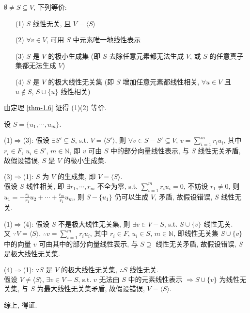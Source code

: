 \documentclass{note}
\begin{document}
\begin{thm}[(课本定理 1.7)]
    $\emptyset\neq S\subseteq V$, 下列等价:
    \begin{itemize}
        \item[(1)] $S$ 线性无关, 且 $V=\langle S\rangle$
        \item[(2)] $\forall v\in V$, 可用 $S$ 中元素唯一地线性表示
        \item[(3)] $S$ 是 $V$ 的极小生成集 (即 $S$ 去除任意元素都无法生成 $V$, 或 $S$ 的任意真子集都无法生成 $V$)
        \item[(4)] $S$ 是 $V$ 的极大线性无关集 (即 $S$ 增加任意元素都线性相关, $\forall u\in V$ 且 $u\notin S$, $S\cup\{u\}$ 线性相关)
    \end{itemize}
\end{thm}
\begin{pf}
    由定理 \ref{thm-1.6} 证得 (1)(2) 等价.

    设 $S=\{u_1,\cdots,u_m\}$.

    (1)$\Longrightarrow$(3): 假设 $\exists S'\subsetneq S$, s.t. $V=\langle S'\rangle$, 则 $\forall v\in S-S'\subseteq V$, $v=\sum_{i=1}^mr_iu_i$, 其中 $r_i\in F$, $u_i\in S'$, $m\in\mathbb{N}$, 即 $v$ 可由 $S$ 中的部分向量线性表示, 与 $S$ 线性无关矛盾, 故假设错误, $S$ 是 $V$ 的极小生成集.

    (3)$\Longrightarrow$(1): $S$ 为 $V$ 的生成集, 即 $V=\langle S\rangle$.\\
    假设 $S$ 线性相关, 即 $\exists r_1,\cdots,r_m$ 不全为零, s.t. $\sum_{i=1}^mr_iu_i=0$, 不妨设 $r_1\neq 0$, 则 $u_1=-\frac{r_2}{r_1}u_2+\cdots+\frac{r_m}{r_1}u_m$, 则 $S-\{u_1\}$ 仍可以生成 $V$, 矛盾, 故假设错误, $S$ 线性无关.

    (1)$\Longrightarrow$(4): 假设 $S$ 不是极大线性无关集, 则 $\exists v\in V-S$, s.t. $S\cup\{v\}$ 线性无关.\\
    又 $\because V=\langle S\rangle$, $\therefore v=\sum_{i=1}^mr_iu_i$, 其中 $r_i\in F$, $u_i\in S$, $m\in\mathbb{N}$, 即线性无关集 $S\cup\{v\}$ 中的向量 $v$ 可由其中的部分向量线性表示, 与 $S\supseteq$ 线性无关矛盾, 故假设错误, $S$ 是极大线性无关集.

    (4)$\Longrightarrow$(1): $\because S$ 是 $V$ 的极大线性无关集, $\therefore S$ 线性无关.\\
    假设 $V\neq\langle S\rangle$, $\exists v\in V-S$, s.t. $v$ 无法由 $S$ 中的元素线性表示 $\Longrightarrow S\cup\{v\}$ 为线性无关集, 与 $S$ 为最大线性无关集矛盾, 故假设错误, $V=\langle S\rangle$.

    综上, 得证.
\end{pf}
\end{document}
